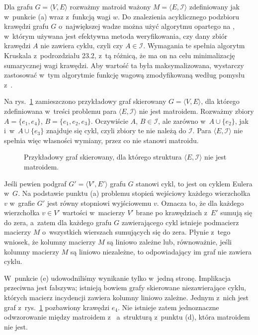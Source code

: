 \subproblem %
Dla grafu $G=\langle V,E\rangle$ rozważmy matroid ważony $M=\langle E,\mathcal{I}\rangle$ zdefiniowany jak w~punkcie (a) wraz z~funkcją wagi $w$.
Do znalezienia acyklicznego podzbioru krawędzi grafu $G$ o~największej wadze można użyć algorytmu opartego na , w~którym używana jest efektywna metoda weryfikowania, czy dany zbiór krawędzi $A$ nie zawiera cyklu, czyli czy $A\in\mathcal{I}$.
Wymagania te spełnia algorytm Kruskala z~podrozdziału 23.2, z~tą różnicą, że ma on na celu minimalizację sumarycznej wagi krawędzi.
Aby wartość ta była maksymalizowana, wystarczy zastosować w~tym algorytmie funkcję wagową zmodyfikowaną według pomysłu z~.

\subproblem %
Na rys.\ \ref{fig:16-3c} zamieszczono przykładowy graf skierowany $G=\langle V,E\rangle$, dla którego zdefiniowana w~treści problemu para $\langle E,\mathcal{I}\rangle$ nie jest matroidem.
Rozważmy zbiory $A=\{e_1,e_4\}$, $B=\{e_1,e_2,e_3\}$.
Oczywiście $A$, $B\in\mathcal{I}$, ale zarówno w~$A\cup\{e_2\}$, jak i~w~$A\cup\{e_3\}$ znajduje się cykl, czyli zbiory te nie należą do $\mathcal{I}$.
Para $\langle E,\mathcal{I}\rangle$ nie spełnia więc własności wymiany, przez co nie stanowi matroidu.
\begin{figure}[!ht]
	\centering 
	\caption{Przykładowy graf skierowany, dla którego struktura $\langle E,\mathcal{I}\rangle$ nie jest matroidem.} \label{fig:16-3c}
\end{figure}

\subproblem %
Jeśli pewien podgraf $G'=\langle V',E'\rangle$ grafu $G$ stanowi cykl, to jest on cyklem Eulera w~$G$.
Na podstawie punktu (a) problemu  stopień wejściowy każdego wierzchołka $v$ w~grafie $G'$ jest równy stopniowi wyjściowemu $v$.
Oznacza to, że dla każdego wierzchołka $v\in V'$ wartości w~macierzy $V'$ brane po krawędziach z~$E'$ sumują się do zera, a~zatem dla każdego grafu $G$ zawierającego cykl istnieje podmacierz macierzy $M$ o~wszystkich wierszach sumujących się do zera.
Płynie z~tego wniosek, że kolumny macierzy $M$ są liniowo zależne lub, równoważnie, jeśli kolumny macierzy $M$ są liniowo niezależne, to odpowiadający im graf nie zawiera cyklu.

\subproblem %
W~punkcie (e) udowodniliśmy wynikanie tylko w~jedną stronę.
Implikacja przeciwna jest fałszywa; istnieją bowiem grafy skierowane niezawierające cyklu, których macierz incydencji zawiera kolumny liniowo zależne.
Jednym z~nich jest graf z~rys.\ \ref{fig:16-3c} pozbawiony krawędzi $e_4$.
Nie istnieje zatem jednoznaczne odwzorowanie między matroidem z~ a~strukturą z~punktu (d), która matroidem nie jest.
